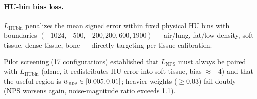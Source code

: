 \paragraph{HU-bin bias loss.}
$L_{\mathrm{HUbin}}$ penalizes the mean signed error within fixed physical HU bins with boundaries $(-1024, -500, -200, 200, 600, 1900)$\hu{} --- air/lung, fat/low-density, soft tissue, dense tissue, bone --- directly targeting per-tissue calibration.

Pilot screening (17 configurations) established that $L_{\mathrm{NPS}}$ must always be paired with $L_{\mathrm{HUbin}}$ (alone, it redistributes HU error into soft tissue, bias ${\approx} -4$\hu{}) and that the useful region is $w_{\mathrm{nps}} \in [0.005, 0.01]$; heavier weights ($\ge 0.03$) fail doubly (NPS worsens again, noise-magnitude ratio exceeds 1.1).
